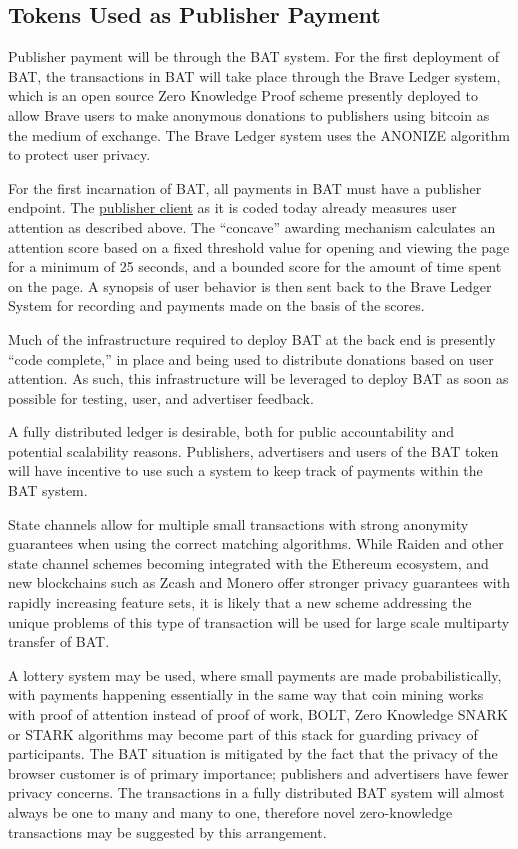 \documentclass[11pt]{article}
\begin{document}
\subsection{Tokens Used as Publisher Payment}
\label{sec-4-3}

Publisher payment will be through the BAT system. For the first deployment of BAT, the transactions in BAT will take place through the Brave Ledger system, which is an open source Zero Knowledge Proof scheme presently deployed to allow Brave users to make anonymous donations to publishers using bitcoin as the medium of exchange.  The Brave Ledger system uses the ANONIZE\cite{13} algorithm to protect user privacy. 

For the first incarnation of BAT, all payments in BAT must have a publisher endpoint. The \href{https://github.com/brave/ledger-publisher}{publisher client} as it is coded today already measures user attention as described above. The ``concave'' awarding mechanism calculates an attention score based on a fixed threshold value for opening and viewing the page for a minimum of 25 seconds, and a bounded score for the amount of time spent on the page. A synopsis of user behavior is then sent back to the Brave Ledger System for recording and payments made on the basis of the scores.

Much of the infrastructure required to deploy BAT at the back end is presently ``code complete,'' in place and being used to distribute donations based on user attention. As such, this infrastructure will be leveraged to deploy BAT as soon as possible for testing, user, and advertiser feedback.

A fully distributed ledger is desirable, both for public accountability and potential scalability reasons. Publishers, advertisers and users of the BAT token will have incentive to use such a system to keep track of payments within the BAT system. 

State channels allow for multiple small transactions with strong anonymity guarantees when using the correct matching algorithms. While Raiden and other state channel schemes becoming integrated with the Ethereum ecosystem, and new blockchains such as Zcash and Monero offer stronger privacy guarantees with rapidly increasing feature sets, it is likely that a new scheme addressing the unique problems of this type of transaction will be used for large scale multiparty transfer of BAT.

 A lottery system may be used, where small payments are made probabilistically, with payments happening essentially in the same way that coin mining works with proof of attention instead of proof of work\cite{14,15}, BOLT\cite{16}, Zero Knowledge SNARK\cite{17} or STARK\cite{18} algorithms may become part of this stack for guarding privacy of participants. The BAT situation is mitigated by the fact that the privacy of the browser customer is of primary importance; publishers and advertisers have fewer privacy concerns. The transactions in a fully distributed BAT system will almost always be one to many and many to one, therefore novel zero-knowledge transactions may be suggested by this arrangement.
\end{document}
